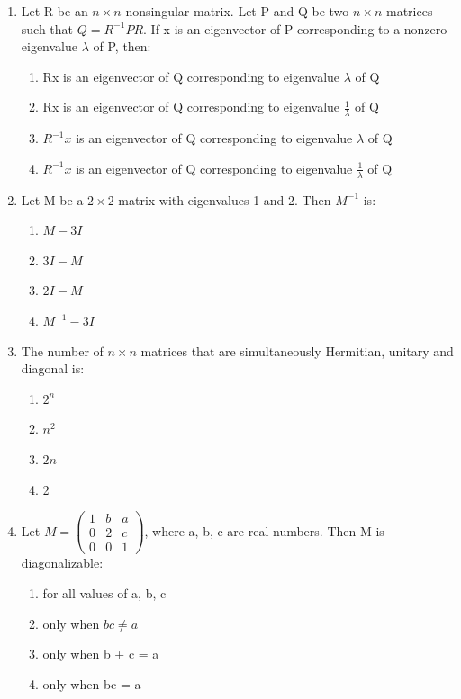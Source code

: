 \documentclass[journal,cmex10]{IEEEtran}
\theoremstyle{remark}
\newcommand{\myvec}[1]{\ensuremath{\begin{pmatrix}#1\end{pmatrix}}}
\numberwithin{equation}{enumi}
\numberwithin{figure}{enumi}
\begin{document}
\begin{enumerate}[label=\arabic*)]
    \item Let R be an $n \times n $ nonsingular matrix. Let P and Q be two  $n \times n $ matrices such that $ Q = R^{-1}PR $. If x  is an eigenvector of  P corresponding to a nonzero eigenvalue $\lambda$ of P, then:
    \bigskip
    \hfill {}
    \begin{enumerate}[label=\alph*)]
        \item Rx  is an eigenvector of Q  corresponding to eigenvalue $\lambda$ of  Q 
        \item  Rx  is an eigenvector of Q  corresponding to eigenvalue $ \frac{1}{\lambda} $ of Q 
        \item $R^{-1}x$  is an eigenvector of Q  corresponding to eigenvalue $\lambda$ of Q 
        \item $ R^{-1}x$ is an eigenvector of Q  corresponding to eigenvalue $ \frac{1}{\lambda} $ of Q 
    \end{enumerate}
    \newpage

    \item Let M  be a $2 \times 2$ matrix with eigenvalues 1 and 2. Then  $ M^{-1}$ is:
    \bigskip
    \hfill {}
    \begin{enumerate}[label=\alph*)]
        \item $M - 3I$
        \item $3I - M$
        \item $2I - M$
        \item $M^{-1} - 3I$
    \end{enumerate}
    \bigskip

    \item The number of $n \times n$ matrices that are simultaneously Hermitian, unitary and diagonal is:
    \bigskip
    \hfill {}
    \begin{enumerate}[label=\alph*)]
        \item $2^n$
        \item $n^2$
        \item $2n$
        \item 2
    \end{enumerate}
    \bigskip

    \item Let $M = \myvec{ 1 & b & a \\ 0 & 2 & c \\ 0 & 0 & 1}$, where  a, b, c are real numbers. Then M is diagonalizable:
    \bigskip
    \hfill {}
    \begin{enumerate}[label=\alph*)]
        \item for all values of a, b, c
        \item only when $bc \neq a$
        \item only when b + c = a 
        \item only when bc = a
    \end{enumerate}
    \bigskip


\end{enumerate}
\end{document}
